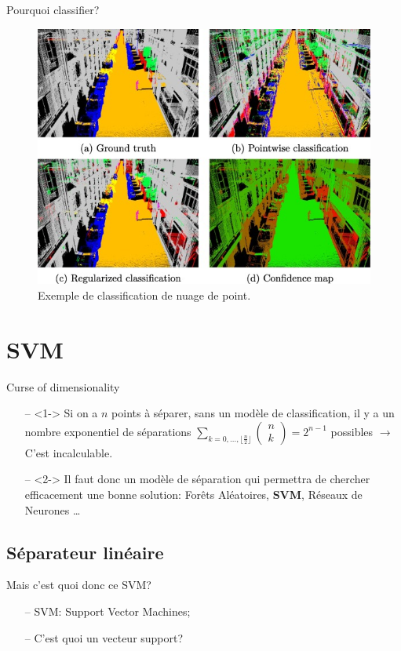 \documentclass[9pt]{beamer}
\begin{document}
	\begin{frame}{Pourquoi classifier?}
		\begin{figure}[H]
			\includegraphics[width=.7\textwidth]{pc_classification}
			\caption{\label{fig::pc_classif}Exemple de classification de nuage de point\cite{LANDRIEU2017102}.}
		\end{figure}
	\end{frame}

	\section[SVM]{SVM}
	\begin{frame}{Curse of dimensionality}
		\begin{itemize}
			\item[--]<1-> Si on a $n$ points à séparer, sans un modèle de classification, il y a un nombre exponentiel de séparations $\sum_{k=0,\dots,\lfloor \frac{n}{2} \rfloor} \begin{pmatrix}
			n\\
			k
			\end{pmatrix} = 2^{n-1}$ possibles $\longrightarrow$ C'est incalculable.
			\item[--]<2-> Il faut donc un modèle de séparation qui permettra de chercher efficacement une bonne solution: Forêts Aléatoires, \textbf{SVM}, Réseaux de Neurones \dots
		\end{itemize}
	\end{frame}
	\subsection[linear]{Séparateur linéaire}
	\begin{frame}{Mais c'est quoi donc ce SVM?}
		\begin{itemize}
			\item[--] SVM\@: Support Vector Machines;
			\item[--] C'est quoi un vecteur support?
		\end{itemize}
	\end{frame}
\end{document}

